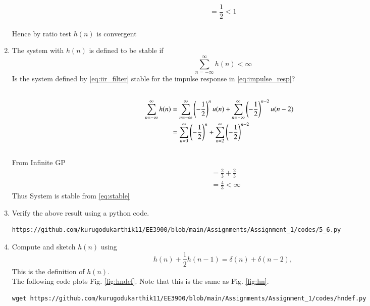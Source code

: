 \documentclass[journal,12pt,twocolumn]{IEEEtran}
\renewcommand\thesection{\arabic{section}}
\begin{document}
\begin{enumerate}[label=\thesection.\arabic*]
        \begin{equation}
            =\frac{1}{2} < 1
        \end{equation}  
\\
Hence by ratio test $h(n)$ is convergent\\
\item The system with $h(n)$ is defined to be stable if
\begin{equation}
\label{eq:stable}
\sum_{n=-\infty}^{\infty}h(n) < \infty
\end{equation}
Is the system defined by \eqref{eq:iir_filter} stable for the impulse response in \eqref{eq:impulse_resp}?
\\
\solution
\begin{align}
\\
\sum_{n=-\infty}^{\infty}h(n) &= \sum_{n=-\infty}^{\infty}\left(-\frac{1}{2}\right)^{n}u(n) + 
\sum_{n=-\infty}^{\infty}\left(-\frac{1}{2}\right)^{n-2}u(n-2)
\\
&=\sum_{n=0}^{\infty}\left(-\frac{1}{2}\right)^{n} + 
\sum_{n=2}^{\infty}\left(-\frac{1}{2}\right)^{n-2}
\end{align} 
\\  From Infinite GP
\begin{align}
&=\frac{2}{3} + \frac{2}{3}\\&=\frac{4}{3}<\infty
\end{align}
Thus System is stable from \eqref{eq:stable}
\bigskip
%
\item Verify the above result using a python code.
\solution
\begin{lstlisting}
https://github.com/kurugodukarthik11/EE3900/blob/main/Assignments/Assignment_1/codes/5_6.py	
\end{lstlisting} 
\item 
Compute and sketch $h(n)$ using 
\begin{equation}
\label{eq:iir_filter_h}
h(n) + \frac{1}{2}h(n-1) = \delta(n) + \delta(n-2), 
\end{equation}
%
This is the definition of $h(n)$.
\\
\solution The following code plots Fig. \ref{fig:hndef}. Note that this is the same as Fig. 
\ref{fig:hn}. 
%
\begin{lstlisting}
wget https://github.com/kurugodukarthik11/EE3900/blob/main/Assignments/Assignment_1/codes/hndef.py	
\end{lstlisting}
\begin{figure}[!ht]
\centering

\end{figure}
\end{enumerate}
\end{document}
